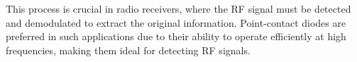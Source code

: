 This process is crucial in radio receivers, where the RF signal must be detected and demodulated to extract the original information. Point-contact diodes are preferred in such applications due to their ability to operate efficiently at high frequencies, making them ideal for detecting RF signals.

